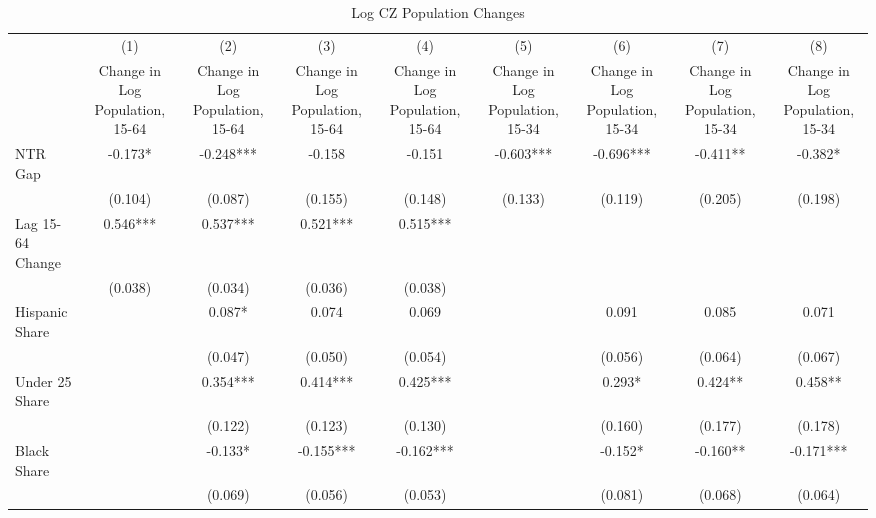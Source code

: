 \begin{table}[htbp]\centering
\def\sym#1{\ifmmode^{#1}\else\(^{#1}\)\fi}
\caption{Log CZ Population Changes}
\begin{tabular}{l*{8}{c}}
\toprule
                    &\multicolumn{1}{c}{(1)}&\multicolumn{1}{c}{(2)}&\multicolumn{1}{c}{(3)}&\multicolumn{1}{c}{(4)}&\multicolumn{1}{c}{(5)}&\multicolumn{1}{c}{(6)}&\multicolumn{1}{c}{(7)}&\multicolumn{1}{c}{(8)}\\
                    &\multicolumn{1}{c}{Change in Log Population, 15-64}&\multicolumn{1}{c}{Change in Log Population, 15-64}&\multicolumn{1}{c}{Change in Log Population, 15-64}&\multicolumn{1}{c}{Change in Log Population, 15-64}&\multicolumn{1}{c}{Change in Log Population, 15-34}&\multicolumn{1}{c}{Change in Log Population, 15-34}&\multicolumn{1}{c}{Change in Log Population, 15-34}&\multicolumn{1}{c}{Change in Log Population, 15-34}\\
\midrule
NTR Gap             &   -0.173*  &   -0.248***&   -0.158   &   -0.151   &   -0.603***&   -0.696***&   -0.411** &   -0.382*  \\
                    &  (0.104)   &  (0.087)   &  (0.155)   &  (0.148)   &  (0.133)   &  (0.119)   &  (0.205)   &  (0.198)   \\
\addlinespace
Lag 15-64 Change    &    0.546***&    0.537***&    0.521***&    0.515***&            &            &            &            \\
                    &  (0.038)   &  (0.034)   &  (0.036)   &  (0.038)   &            &            &            &            \\
\addlinespace
Hispanic Share      &            &    0.087*  &    0.074   &    0.069   &            &    0.091   &    0.085   &    0.071   \\
                    &            &  (0.047)   &  (0.050)   &  (0.054)   &            &  (0.056)   &  (0.064)   &  (0.067)   \\
\addlinespace
Under 25 Share      &            &    0.354***&    0.414***&    0.425***&            &    0.293*  &    0.424** &    0.458** \\
                    &            &  (0.122)   &  (0.123)   &  (0.130)   &            &  (0.160)   &  (0.177)   &  (0.178)   \\
\addlinespace
Black Share         &            &   -0.133*  &   -0.155***&   -0.162***&            &   -0.152*  &   -0.160** &   -0.171***\\
                    &            &  (0.069)   &  (0.056)   &  (0.053)   &            &  (0.081)   &  (0.068)   &  (0.064)   \\

\end{tabular}
\end{table}
